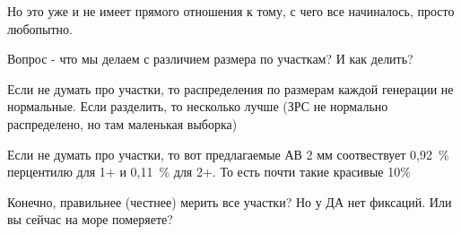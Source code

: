 \documentclass[12pt, a4paper]{article}
\begin{document}
\begin{description}
Но это уже и не имеет прямого отношения к тому, с чего все начиналось, просто любопытно.

Вопрос - что мы делаем с различием размера по участкам? 
И как делить?

Если не думать про участки, то распределения по размерам каждой генерации не нормальные. 
Если разделить, то несколько лучше (ЗРС не нормально распределено, но там маленькая выборка)

Если не думать про участки, то вот предлагаемые АВ 2 мм соотвествует 0,92~\% перцентилю для 1+ и 0,11~\% для 2+. То есть почти такие красивые 10\%

Конечно, правильнее (честнее) мерить все участки? Но у ДА нет фиксаций. Или вы сейчас на море померяете?


\end{description}
\end{document}
